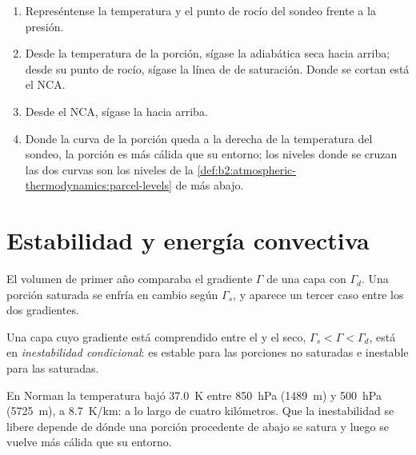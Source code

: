 \begin{method}\label{met:b2:atmospheric-thermodynamics:lift}
\begin{enumerate}
  \item Represéntense la temperatura y el punto de rocío del sondeo frente a la presión.
  \item Desde la temperatura de la porción, sígase la adiabática seca hacia arriba; desde su punto de rocío, sígase
        la línea de  de saturación. Donde se cortan está el NCA.
  \item Desde el NCA, sígase la  hacia arriba.
  \item Donde la curva de la porción queda a la derecha de la temperatura del sondeo, la porción es
        más cálida que su entorno; los niveles donde se cruzan las dos curvas son los niveles de la
        \cref{def:b2:atmospheric-thermodynamics:parcel-levels} de más abajo.
\end{enumerate}
\end{method}


\section{Estabilidad y energía convectiva}\label{sec:b2:atmospheric-thermodynamics:stability}

El volumen de primer año comparaba el gradiente $\Gamma$ de una capa con $\Gamma_d$. Una porción saturada
se enfría en cambio según $\Gamma_s$, y aparece un tercer caso entre los dos gradientes.

\begin{definition}\label{def:b2:atmospheric-thermodynamics:instability}
Una capa cuyo gradiente está comprendido entre el  y el seco,
$\Gamma_s < \Gamma < \Gamma_d$, está en
\emph{inestabilidad condicional}: es estable para las porciones no saturadas e inestable para las saturadas.
\end{definition}

En Norman la temperatura bajó \qty{37.0}{K} entre \qty{850}{hPa} (\qty{1489}{m}) y
\qty{500}{hPa} (\qty{5725}{m}), a \qty{8.7}{K/km}:  a lo largo de cuatro kilómetros.
Que la inestabilidad se libere depende de dónde una porción procedente de abajo se satura y
luego se vuelve más cálida que su entorno.

